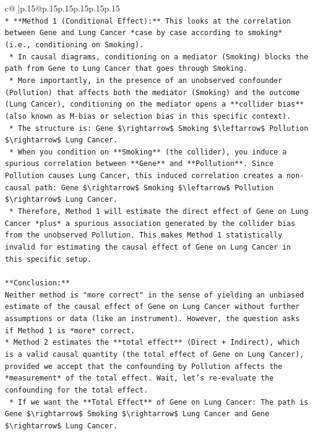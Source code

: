 \documentclass{article}
\begin{document}
{\begin{supertabular}{c@{$\;$}|p{.15\linewidth}@{}p{.15\linewidth}p{.15\linewidth}p{.15\linewidth}p{.15\linewidth}p{.15\linewidth}}
{{{\\ 
\texttt{*   **Method 1 (Conditional Effect):** This looks at the correlation between Gene and Lung Cancer *case by case according to smoking* (i.e., conditioning on Smoking).} \\
\texttt{    *   In causal diagrams, conditioning on a mediator (Smoking) blocks the path from Gene to Lung Cancer that goes through Smoking.} \\
\texttt{    *   More importantly, in the presence of an unobserved confounder (Pollution) that affects both the mediator (Smoking) and the outcome (Lung Cancer), conditioning on the mediator opens a **collider bias** (also known as M{-}bias or selection bias in this specific context).} \\
\texttt{    *   The structure is: Gene \$\textbackslash{}rightarrow\$ Smoking \$\textbackslash{}leftarrow\$ Pollution \$\textbackslash{}rightarrow\$ Lung Cancer.} \\
\texttt{    *   When you condition on **Smoking** (the collider), you induce a spurious correlation between **Gene** and **Pollution**. Since Pollution causes Lung Cancer, this induced correlation creates a non{-}causal path: Gene \$\textbackslash{}rightarrow\$ Smoking \$\textbackslash{}leftarrow\$ Pollution \$\textbackslash{}rightarrow\$ Lung Cancer.} \\
\texttt{    *   Therefore, Method 1 will estimate the direct effect of Gene on Lung Cancer *plus* a spurious association generated by the collider bias from the unobserved Pollution. This makes Method 1 statistically invalid for estimating the causal effect of Gene on Lung Cancer in this specific setup.} \\
\\ 
\texttt{**Conclusion:**} \\
\texttt{Neither method is "more correct" in the sense of yielding an unbiased estimate of the causal effect of Gene on Lung Cancer without further assumptions or data (like an instrument). However, the question asks if Method 1 is *more* correct.} \\
\texttt{*   Method 2 estimates the **total effect** (Direct + Indirect), which is a valid causal quantity (the total effect of Gene on Lung Cancer), provided we accept that the confounding by Pollution affects the *measurement* of the total effect. Wait, let's re{-}evaluate the confounding for the total effect.} \\
\texttt{    *   If we want the **Total Effect** of Gene on Lung Cancer: The path is Gene \$\textbackslash{}rightarrow\$ Smoking \$\textbackslash{}rightarrow\$ Lung Cancer and Gene \$\textbackslash{}rightarrow\$ Lung Cancer.} \\
}}}
\end{supertabular}}
\end{document}

